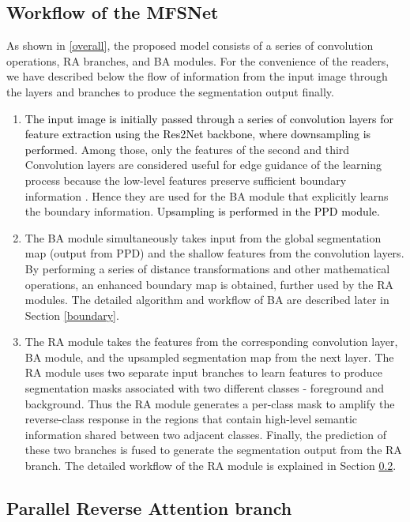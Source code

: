 \documentclass[review]{elsarticle}
\begin{document}
\subsection{Workflow of the MFSNet}\label{featflow}
As shown in \autoref{overall}, the proposed model consists of a series of convolution operations, RA branches, and BA modules. For the convenience of the readers, we have described below the flow of information from the input image through the layers and branches to produce the segmentation output finally.
\begin{enumerate}
    \item \textcolor{black}{The input image is initially passed through a series of convolution layers for feature extraction using the Res2Net backbone, where downsampling is performed}. Among those, only the features of the second and third Convolution layers are considered useful for edge guidance of the learning process because the low-level features preserve sufficient boundary information \cite{zhang2019net}. Hence they are used for the BA module that explicitly learns the boundary information. \textcolor{black}{Upsampling is performed in the PPD module. }
    \item The BA module simultaneously takes input from the global segmentation map (output from PPD) and the shallow features from the convolution layers. By performing a series of distance transformations and other mathematical operations, an enhanced boundary map is obtained, further used by the RA modules. The detailed algorithm and workflow of BA are described later in Section \ref{boundary}.
    \item The RA module takes the features from the corresponding convolution layer, BA module, and the upsampled segmentation map from the next layer. The RA module uses two separate input branches to learn features to produce segmentation masks associated with two different classes - foreground and background. Thus the RA module generates a per-class mask to amplify the reverse-class response in the regions that contain high-level semantic information shared between two adjacent classes. Finally, the prediction of these two branches is fused to generate the segmentation output from the RA branch. The detailed workflow of the RA module is explained in Section \ref{RA}.
\end{enumerate}


\subsection{Parallel Reverse Attention branch}\label{RA}
\end{document}
